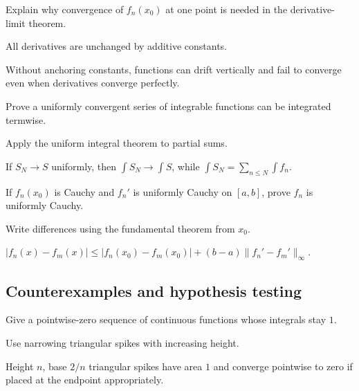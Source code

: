 \begin{exercise}\label{exr:ii12-expand-07}
Explain why convergence of \(f_n(x_0)\) at one point is needed in the derivative-limit theorem.
\end{exercise}
\begin{hint}
All derivatives are unchanged by additive constants.
\end{hint}
\begin{solution}
Without anchoring constants, functions can drift vertically and fail to converge even when derivatives converge perfectly.
\end{solution}

\begin{exercise}\label{exr:ii12-expand-08}
Prove a uniformly convergent series of integrable functions can be integrated termwise.
\end{exercise}
\begin{hint}
Apply the uniform integral theorem to partial sums.
\end{hint}
\begin{solution}
If \(S_N\to S\) uniformly, then \(\int S_N\to\int S\), while \(\int S_N=\sum_{n\le N}\int f_n\).
\end{solution}

\begin{exercise}\label{exr:ii12-expand-09}
If \(f_n(x_0)\) is Cauchy and \(f_n'\) is uniformly Cauchy on \([a,b]\), prove \(f_n\) is uniformly Cauchy.
\end{exercise}
\begin{hint}
Write differences using the fundamental theorem from \(x_0\).
\end{hint}
\begin{solution}
\(|f_n(x)-f_m(x)|\le|f_n(x_0)-f_m(x_0)|+(b-a)\|f_n'-f_m'\|_\infty\).
\end{solution}

\subsection*{Counterexamples and hypothesis testing}

\begin{exercise}\label{exr:ii12-expand-10}
Give a pointwise-zero sequence of continuous functions whose integrals stay \(1\).
\end{exercise}
\begin{hint}
Use narrowing triangular spikes with increasing height.
\end{hint}
\begin{solution}
Height \(n\), base \(2/n\) triangular spikes have area \(1\) and converge pointwise to zero if placed at the endpoint appropriately.
\end{solution}

